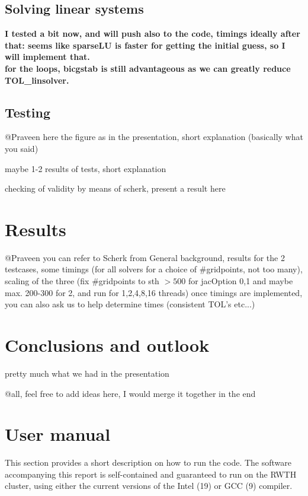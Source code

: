 \documentclass[11pt]{scrartcl}
\begin{document}
\subsection{Solving linear systems}

	\textbf{I tested a bit now, and will push also to the code, timings ideally after that:
	seems like sparseLU is faster for getting the initial guess, so I will implement that.\\
	for the loops, bicgstab is still advantageous as we can greatly reduce TOL\_linsolver.}
\normalfont
\subsection{Testing}
@Praveen
here the figure as in the presentation, short explanation (basically what you said)

maybe 1-2 results of tests, short explanation

checking of validity by means of scherk, present a result here

\section{Results}
@Praveen you can refer to Scherk from General background, 
results for the 2 testcases, some timings (for all solvers for a choice of $\#$gridpoints, not too many), scaling of the three (fix $\#$gridpoints to sth $>500$ for jacOption 0,1 and maybe max. 200-300 for 2, and run for 1,2,4,8,16 threads)
once timings are implemented, you can also ask us to help determine times (consistent TOL's etc...)


\section{Conclusions and outlook}
pretty much what we had in the presentation

@all, feel free to add ideas here, I would merge it together in the end


%


\clearpage
\appendix
\section{User manual}
This section provides a short description on how to run the code. The software accompanying this report is self-contained and guaranteed to run on the RWTH cluster, using either the current versions of the Intel (19) or GCC (9) compiler.
\end{document}
